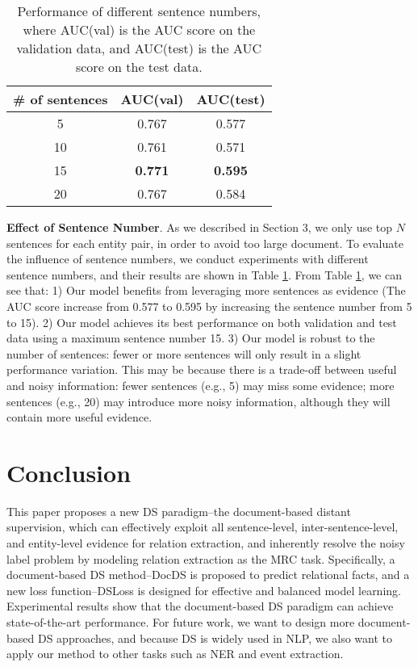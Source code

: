 \documentclass[11pt,a4paper]{article}
\begin{document}
  \begin{table}[!tbp]
    \setlength{\belowcaptionskip}{-1em}
    \centering
      \begin{tabular}{ccc}
      \toprule
      \# of sentences & AUC(val) & AUC(test) \\
      \midrule
      5     & 0.767 &  0.577 \\
      10    & 0.761 & 0.571 \\
      15    & \textbf{0.771}  & \textbf{0.595} \\
      20    & 0.767 &  0.584 \\
      \bottomrule
      \end{tabular}\caption{Performance of different sentence numbers, where AUC(val) is the AUC score on the validation data, and AUC(test) is the AUC score on the test data.}
    \label{tab:sentence}\end{table}

  \textbf{Effect of Sentence Number}.
  As we described in Section 3, we only use top $N$ sentences for each entity pair, in order to avoid too large document.
  To evaluate the influence of sentence numbers,
  we conduct experiments with different sentence numbers, and their results are shown in Table \ref{tab:sentence}.
  From Table \ref{tab:sentence}, we can see that:
  1) Our model benefits from leveraging more sentences as evidence (The AUC score increase from 0.577 to 0.595 by increasing the sentence number from 5 to 15).
  2) Our model achieves its best performance on both validation and test data using a maximum sentence number 15.
  3) Our model is robust to the number of sentences: fewer or more sentences will only result in a slight performance variation.
  This may be because there is a trade-off between useful and noisy information:
  fewer sentences (e.g., 5) may miss some evidence; more sentences (e.g., 20) may introduce more noisy information, although they will contain more useful evidence.
  
  \section{Conclusion}
  This paper proposes a new DS paradigm--the document-based distant supervision, which can effectively exploit all sentence-level, inter-sentence-level, and entity-level evidence for relation extraction, and inherently resolve the noisy label problem by modeling relation extraction as the MRC task. Specifically, a document-based DS method--DocDS is proposed to predict relational facts, and a new loss function--DSLoss is designed for effective and balanced model learning. Experimental results show that the document-based DS paradigm can achieve state-of-the-art performance. For future work, we want to design more document-based DS approaches, and because DS is widely used in NLP, we also want to apply our method to other tasks such as NER and event extraction.



\end{document}

